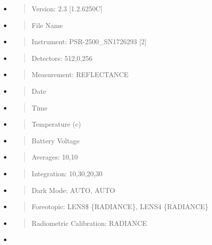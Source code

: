\documentclass[
]{article}
\begin{document}
\begin{itemize}
\item
  \begin{quote}
  Version: 2.3 {[}1.2.6250C{]}
  \end{quote}
\item
  \begin{quote}
  File Name
  \end{quote}
\item
  \begin{quote}
  Instrument: PSR-2500\_SN1726293 {[}2{]}
  \end{quote}
\item
  \begin{quote}
  Detectors: 512,0,256
  \end{quote}
\item
  \begin{quote}
  Measurement: REFLECTANCE
  \end{quote}
\item
  \begin{quote}
  Date
  \end{quote}
\item
  \begin{quote}
  Time
  \end{quote}
\item
  \begin{quote}
  Temperature (c)
  \end{quote}
\item
  \begin{quote}
  Battery Voltage
  \end{quote}
\item
  \begin{quote}
  Averages: 10,10
  \end{quote}
\item
  \begin{quote}
  Integration: 10,30,20,30
  \end{quote}
\item
  \begin{quote}
  Dark Mode: AUTO, AUTO
  \end{quote}
\item
  \begin{quote}
  Foreotopic: LENS\$ \{RADIANCE\}, LENS4 \{RADIANCE\}
  \end{quote}
\item
  \begin{quote}
  Radiometric Calibration: RADIANCE
  \end{quote}
\item

\end{itemize}
\end{document}
